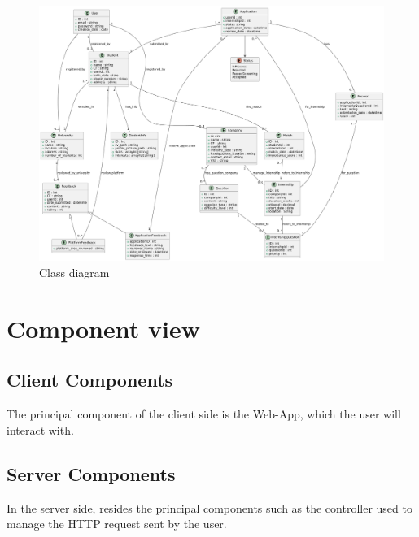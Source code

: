 \begin{figure}[!ht]
    \centering
    \includegraphics[scale=0.33]{Images/ImagesDD/class_diagram.png}
    \caption{Class diagram}
\end{figure}


\newpage

\section{Component view}

\subsection{Client Components}
The principal component of the client side is the Web-App, which the user will interact with.

\subsection{Server Components}

In the server side, resides the principal components such as the controller used to manage the HTTP request sent by the user.


